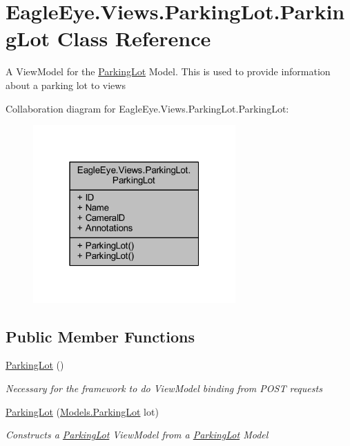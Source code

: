 \hypertarget{class_eagle_eye_1_1_views_1_1_parking_lot_1_1_parking_lot}{}\section{Eagle\+Eye.\+Views.\+Parking\+Lot.\+Parking\+Lot Class Reference}
\label{class_eagle_eye_1_1_views_1_1_parking_lot_1_1_parking_lot}


A View\+Model for the \mbox{\hyperlink{class_eagle_eye_1_1_views_1_1_parking_lot_1_1_parking_lot}{Parking\+Lot}} Model. This is used to provide information about a parking lot to views  




Collaboration diagram for Eagle\+Eye.\+Views.\+Parking\+Lot.\+Parking\+Lot\+:
\nopagebreak
\begin{figure}[H]
\begin{center}
\leavevmode
\includegraphics[width=220pt]{class_eagle_eye_1_1_views_1_1_parking_lot_1_1_parking_lot__coll__graph}
\end{center}
\end{figure}
\subsection*{Public Member Functions}
\begin{DoxyCompactItemize}
\item 
\mbox{\hyperlink{class_eagle_eye_1_1_views_1_1_parking_lot_1_1_parking_lot_ab1048c32ed1b8cfa5e06f8cd9f614e03}{Parking\+Lot}} ()
\begin{DoxyCompactList}\small\item\em Necessary for the framework to do View\+Model binding from P\+O\+ST requests \end{DoxyCompactList}\item 
\mbox{\hyperlink{class_eagle_eye_1_1_views_1_1_parking_lot_1_1_parking_lot_a59da91cf482ad49cc2ff6ac1ea051f7f}{Parking\+Lot}} (\mbox{\hyperlink{class_eagle_eye_1_1_models_1_1_parking_lot}{Models.\+Parking\+Lot}} lot)
\begin{DoxyCompactList}\small\item\em Constructs a \mbox{\hyperlink{class_eagle_eye_1_1_views_1_1_parking_lot_1_1_parking_lot}{Parking\+Lot}} View\+Model from a \mbox{\hyperlink{class_eagle_eye_1_1_views_1_1_parking_lot_1_1_parking_lot}{Parking\+Lot}} Model \end{DoxyCompactList}\end{DoxyCompactItemize}
